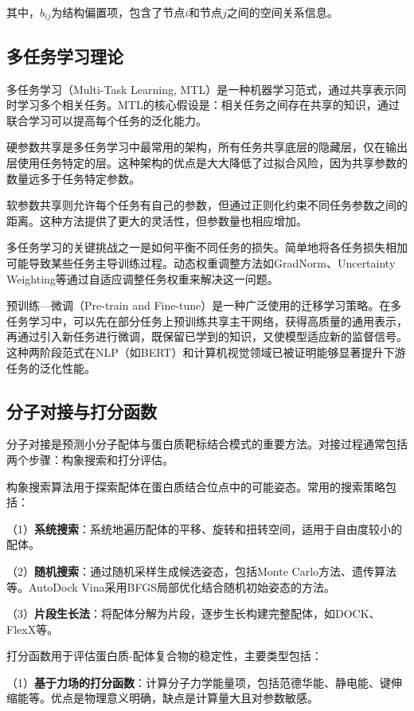 其中，$b_{ij}$为结构偏置项，包含了节点$i$和节点$j$之间的空间关系信息。

\subsection{多任务学习理论}

多任务学习（Multi-Task Learning, MTL）是一种机器学习范式，通过共享表示同时学习多个相关任务。MTL的核心假设是：相关任务之间存在共享的知识，通过联合学习可以提高每个任务的泛化能力。

硬参数共享是多任务学习中最常用的架构，所有任务共享底层的隐藏层，仅在输出层使用任务特定的层。这种架构的优点是大大降低了过拟合风险，因为共享参数的数量远多于任务特定参数。

软参数共享则允许每个任务有自己的参数，但通过正则化约束不同任务参数之间的距离。这种方法提供了更大的灵活性，但参数量也相应增加。

多任务学习的关键挑战之一是如何平衡不同任务的损失。简单地将各任务损失相加可能导致某些任务主导训练过程。动态权重调整方法如GradNorm、Uncertainty Weighting等通过自适应调整任务权重来解决这一问题。

预训练—微调（Pre-train and Fine-tune）是一种广泛使用的迁移学习策略。在多任务学习中，可以先在部分任务上预训练共享主干网络，获得高质量的通用表示，再通过引入新任务进行微调，既保留已学到的知识，又使模型适应新的监督信号。这种两阶段范式在NLP（如BERT）和计算机视觉领域已被证明能够显著提升下游任务的泛化性能。

\subsection{分子对接与打分函数}

分子对接是预测小分子配体与蛋白质靶标结合模式的重要方法。对接过程通常包括两个步骤：构象搜索和打分评估。

构象搜索算法用于探索配体在蛋白质结合位点中的可能姿态。常用的搜索策略包括：

（1）\textbf{系统搜索}：系统地遍历配体的平移、旋转和扭转空间，适用于自由度较小的配体。

（2）\textbf{随机搜索}：通过随机采样生成候选姿态，包括Monte Carlo方法、遗传算法等。AutoDock Vina采用BFGS局部优化结合随机初始姿态的方法。

（3）\textbf{片段生长法}：将配体分解为片段，逐步生长构建完整配体，如DOCK、FlexX等。

打分函数用于评估蛋白质-配体复合物的稳定性，主要类型包括：

（1）\textbf{基于力场的打分函数}：计算分子力学能量项，包括范德华能、静电能、键伸缩能等。优点是物理意义明确，缺点是计算量大且对参数敏感。

